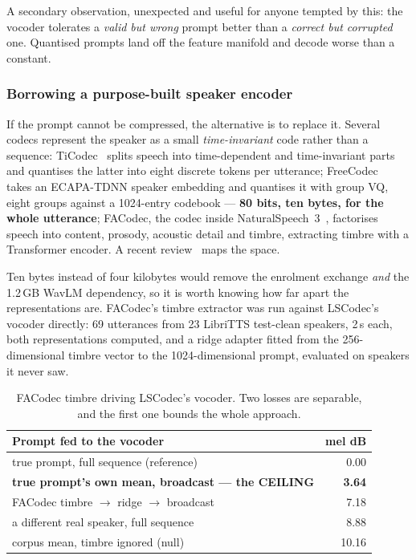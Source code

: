 A secondary observation, unexpected and useful for anyone tempted by
this: the vocoder tolerates a \emph{valid but wrong} prompt better than
a \emph{correct but corrupted} one.  Quantised prompts land off the
feature manifold and decode worse than a constant.

\subsubsection{Borrowing a purpose-built speaker encoder}
\label{sec:voice_facodec}

If the prompt cannot be compressed, the alternative is to replace it.
Several codecs represent the speaker as a small \emph{time-invariant}
code rather than a sequence: TiCodec~\cite{ren2024ticodec} splits speech
into time-dependent and time-invariant parts and quantises the latter
into eight discrete tokens per utterance; FreeCodec~\cite{zheng2024freecodec}
takes an ECAPA-TDNN speaker embedding and quantises it with group VQ,
eight groups against a 1024-entry codebook --- \textbf{80 bits, ten
bytes, for the whole utterance}; FACodec, the codec inside
NaturalSpeech~3~\cite{ju2024naturalspeech3}, factorises speech into
content, prosody, acoustic detail and timbre, extracting timbre with a
Transformer encoder.  A recent review~\cite{guo2025tokenreview} maps the
space.

Ten bytes instead of four kilobytes would remove the enrolment exchange
\emph{and} the 1.2\,GB WavLM dependency, so it is worth knowing how far
apart the representations are.  FACodec's timbre extractor was run
against LSCodec's vocoder directly: 69 utterances from 23 LibriTTS
test-clean speakers, 2\,s each, both representations computed, and a
ridge adapter fitted from the 256-dimensional timbre vector to the
1024-dimensional prompt, evaluated on speakers it never saw.

\begin{table}[H]
    \centering
    \caption{FACodec timbre driving LSCodec's vocoder.  Two losses are
             separable, and the first one bounds the whole approach.}
    \label{tab:voice_facodec}
    \small
    \begin{tabular}{@{}lr@{}}
    \toprule
    \textbf{Prompt fed to the vocoder} & \textbf{mel dB} \\
    \midrule
    true prompt, full sequence (reference)      & 0.00 \\
    \textbf{true prompt's own mean, broadcast --- the CEILING}
                                                & \textbf{3.64} \\
    FACodec timbre $\rightarrow$ ridge $\rightarrow$ broadcast & 7.18 \\
    a different real speaker, full sequence     & 8.88 \\
    corpus mean, timbre ignored (null)          & 10.16 \\
    \bottomrule
    \end{tabular}
\end{table}


